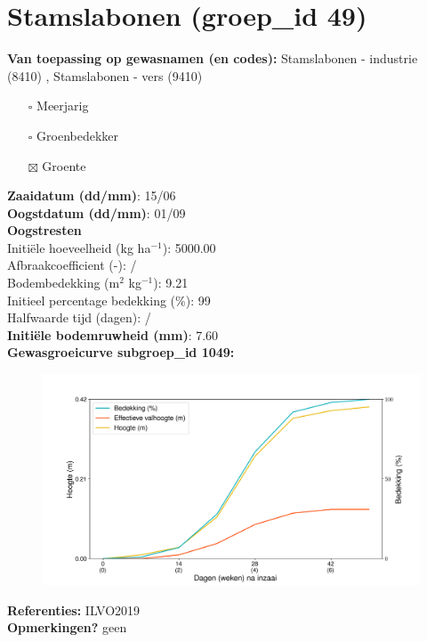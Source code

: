 \documentclass{article}
\begin{document}
 \section{Stamslabonen (groep\_id 49)} 
 \textbf{Van toepassing op gewasnamen (en codes):} Stamslabonen - industrie (8410) , Stamslabonen - vers (9410) 
 \begin{multicols}{3} \begin{itemize} \item[$\square$] Meerjarig \item[$\square$] Groenbedekker \item[$\boxtimes$] Groente \end{itemize} \end{multicols} 
  \textbf{Zaaidatum (dd/mm)}: 15/06  \vspace{0.10cm} \\ 
  \textbf{Oogstdatum (dd/mm)}: 01/09  \vspace{0.10cm} \\ 
  \textbf{Oogstresten} \vspace{0.05cm} \\ 
  \tab Initi\"{e}le hoeveelheid (kg ha$^{-1}$): 5000.00 \vspace{0.05cm} \\ 
  \tab Afbraakcoefficient (-): / \vspace{0.05cm} \\ 
  \tab Bodembedekking (m$^2$ kg$^{-1}$): 9.21 \vspace{0.05cm} \\ 
  \tab Initieel percentage bedekking (\%): 99 \vspace{0.05cm} \\ 
  \tab Halfwaarde tijd (dagen): / \vspace{0.05cm} \\ 
  \textbf{Initi\"{e}le bodemruwheid (mm)}: 7.60 \vspace{0.05cm} \\ 
  \textbf{Gewasgroeicurve subgroep\_id 1049:} 
 \begin{center} \begin{figure}[H] \includegraphics[width=12.5cm]{temp/1049.png} \end{figure} \end{center} 
  \textbf{Referenties:} ILVO2019 \vspace{0.10cm} \\ 
  \textbf{Opmerkingen?} geen \vspace{0.10cm} \\ 
 \newpage 
\end{document}
